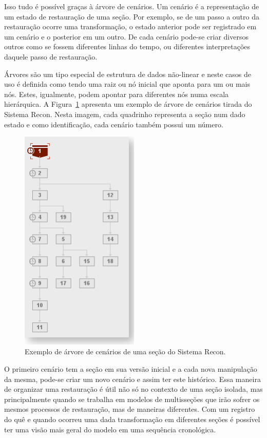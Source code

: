 Isso tudo é possível graças à árvore de cenários. Um cenário é a representação de um estado de restauração de uma seção. Por exemplo, se de um passo a outro da restauração ocorre uma transformação, o estado anterior pode ser registrado em um cenário e o posterior em um outro. De cada cenário pode-se criar diversos outros como se fossem diferentes linhas do tempo, ou diferentes interpretações daquele passo de restauração.

Árvores são um tipo especial de estrutura de dados não-linear e neste casos de uso é definida como tendo uma raiz ou nó inicial que aponta para um ou mais nós. Estes, igualmente, podem apontar para diferentes nós numa escala hierárquica. A Figura~\ref{fig-recon-6} apresenta um exemplo de árvore de cenários tirada do Sistema Recon. Nesta imagem, cada quadrinho representa a seção num dado estado e como identificação, cada cenário também possui um número.

\begin{figure} [H]
  \begin{center}
    \includegraphics[width=160pt]{images/fig-recon-6}
    \caption{Exemplo de árvore de cenários de uma seção do Sistema Recon.}\label{fig-recon-6}
  \end{center}
\end{figure}

O primeiro cenário tem a seção em sua versão inicial e a cada nova manipulação da mesma, pode-se criar um novo cenário e assim ter este histórico. Essa maneira de organizar uma restauração é útil não só no contexto de uma seção isolada, mas principalmente quando se trabalha em modelos de multisseções que irão sofrer os mesmos processos de restauração, mas de maneiras diferentes. Com um registro do quê e quando ocorreu uma dada transformação em diferentes seções é possível ter uma visão mais geral do modelo em uma sequência cronológica.

